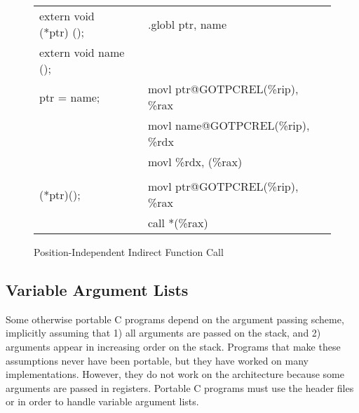 \begin{figure}[H]
\Hrule
\caption{Position-Independent Indirect Function Call}
\begin{center}
\begin{tabular}{|l|c|l|}
\cline{1-1}\cline{3-3}
extern void (*ptr) ();    &&.globl ptr, name\\
extern void name ();      && \\
ptr = name;               &&movl ptr@GOTPCREL(\%rip), \%rax  \\
                          &&movl name@GOTPCREL(\%rip), \%rdx  \\
                          &&movl \%rdx, (\%rax)  \\
                          &&  \\
(*ptr)();                 &&movl ptr@GOTPCREL(\%rip), \%rax  \\
                          &&call *(\%rax)  \\
\cline{1-1}\cline{3-3}
\end{tabular}
\end{center}
\Hrule
\end{figure}

\subsection{Variable Argument Lists}

Some otherwise portable C programs depend on the argument passing
scheme, implicitly assuming that 1) all arguments are passed on the
stack, and 2) arguments appear in increasing order on the stack.
Programs that make these assumptions never have been portable, but
they have worked on many implementations. However, they do not work on
the \xARCH architecture because some arguments are passed in
registers.  Portable C programs must use the header files
 or  in order to handle variable
argument lists.

